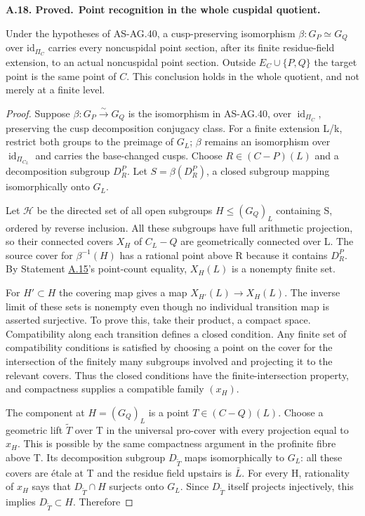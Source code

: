 \documentclass[11pt,a4paper]{article}
\newenvironment{claim}[3]{\par\medskip\noindent\hypertarget{#1}{\textbf{#1. #2.}}\ \textbf{#3.}\par\nopagebreak\smallskip\begingroup\itshape}{\endgroup\par\smallskip}
\newcommand{\statementref}[1]{\hyperlink{#1}{#1}}
\begin{document}
\begin{claim}{A.18}{Proved}{Point recognition in the whole cuspidal quotient}

Under the hypotheses of AS-AG.40, a cusp-preserving isomorphism
$\beta:G_P\simeq G_Q$ over $\mathrm{id}_{\Pi_C}$ carries every
noncuspidal point section, after its finite residue-field extension,
to an actual noncuspidal point section. Outside $E_C\cup\{P,Q\}$ the
target point is the same point of $C$. This conclusion holds in the
whole quotient, and not merely at a finite level.

\end{claim}

\begin{proof}

Suppose \(\beta:G_P\xrightarrow\sim G_Q\) is the isomorphism in AS-AG.40, over \(\operatorname{id}_{{\Pi}_C}\), preserving the cusp decomposition conjugacy class. For a finite extension L/k, restrict both groups to the preimage of \(G_L\); \({\beta}\) remains an isomorphism over \(\operatorname{id}_{{\Pi}_{C_L}}\) and carries the base-changed cusps. Choose \(R{\in}(C-P)(L)\) and a decomposition subgroup \(D_R^P\). Let \(S={\beta}(D_R^P)\), a closed subgroup mapping isomorphically onto \(G_L\).

Let \(\mathcal H\) be the directed set of all open subgroups \(H{\le}(G_Q)_L\) containing S, ordered by reverse inclusion. All these subgroups have full arithmetic projection, so their connected covers \(X_H\) of \(C_L-Q\) are geometrically connected over L. The source cover for \({\beta}^{-1}(H)\) has a rational point above R because it contains \(D_R^P\). By Statement \statementref{A.15}'s point-count equality, \(X_H(L)\) is a nonempty finite set.

For \(H'{\subset}H\) the covering map gives a map \(X_{H'}(L){\to}X_H(L)\). The inverse limit of these sets is nonempty even though no individual transition map is asserted surjective. To prove this, take their product, a compact space. Compatibility along each transition defines a closed condition. Any finite set of compatibility conditions is satisfied by choosing a point on the cover for the intersection of the finitely many subgroups involved and projecting it to the relevant covers. Thus the closed conditions have the finite-intersection property, and compactness supplies a compatible family \((x_H)\).

The component at \(H=(G_Q)_L\) is a point \(T{\in}(C-Q)(L)\). Choose a geometric lift \(\widetilde T\) over T in the universal pro-cover with every projection equal to \(x_H\). This is possible by the same compactness argument in the profinite fibre above T. Its decomposition subgroup \(D_{\widetilde T}\) maps isomorphically to \(G_L\): all these covers are étale at T and the residue field upstairs is \(\bar L\). For every H, rationality of \(x_H\) says that \(D_{\widetilde T}{\cap}H\) surjects onto \(G_L\). Since \(D_{\widetilde T}\) itself projects injectively, this implies \(D_{\widetilde T}{\subset}H\). Therefore


\end{proof}
\end{document}
